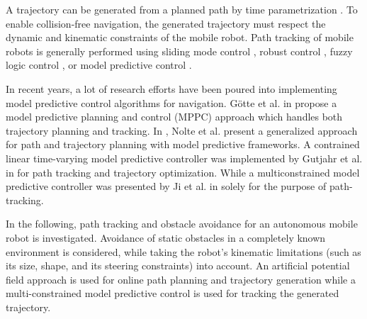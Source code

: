 \documentclass[a4paper, twocolumn]{article}
\begin{document}
A trajectory can be generated from a planned path by time parametrization \cite{roesmann1}. To enable collision-free navigation, the generated trajectory must respect the dynamic and kinematic constraints of the mobile robot.
Path tracking of mobile robots is generally performed using sliding mode control \cite{yang1}, robust control \cite{normey-rico1}, fuzzy logic control \cite{antonelli1}, or model predictive control \cite{ji1}.

In recent years, a lot of research efforts have been poured into implementing model predictive control algorithms for navigation.
Götte et al. in \cite{goette1} propose a model predictive planning and control (MPPC) approach which handles both trajectory planning and tracking.
In \cite{nolte1}, Nolte et al. present a generalized approach for path and trajectory planning with model predictive frameworks.
A contrained linear time-varying model predictive controller was implemented by Gutjahr et al. in \cite{gutjahr1} for path tracking and trajectory optimization.
While a multiconstrained model predictive controller was presented by Ji et al. in \cite{ji1} solely for the purpose of path-tracking.

In the following, path tracking and obstacle avoidance for an autonomous mobile robot is investigated.
Avoidance of static obstacles in a completely known environment is considered, while taking the robot’s kinematic limitations (such as its size, shape, and its steering constraints) into account.
An artificial potential field approach is used for online path planning and trajectory generation while a multi-constrained model predictive control is used for tracking the generated trajectory.



 
\end{document}
